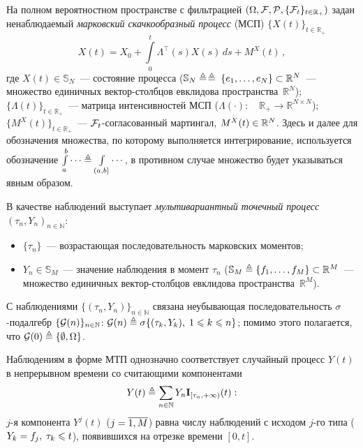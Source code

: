 \begin{multicols}{2}
 На полном вероятностном пространстве с фильтрацией
 $(\Omega,{\mathcal F},{\mathcal P},\{{\mathcal F}_t\}_{t \in \mathbb{R}_+})$ задан ненаблюдаемый
 \textit{марковский скачкообразный процесс} (МСП) $\{X(t)\}_{t \in \mathbb{R}_+}$~\cite{ElliottAM_94}
 \begin{equation}
 X(t) = X_0 + \int\limits_0^t \Lambda^{\top}(s)X(s)\,ds+M^X(t)\,,
 \label{eq:state}
 \end{equation}
 где
 $X(t) \in \mathbb{S}_N$~---
 со\-сто\-яние процесса ($\mathbb{S}_N \triangleq$\linebreak $\triangleq\;\{e_1, \ldots , e_N\} \subset
 \mathbb{R}^{N}$~--- множество единичных век\-тор-столб\-цов евклидова пространства~$\mathbb{R}^{N}$);
 $\{\Lambda(t)\}_{t \in \mathbb{R}_+}$~--- матрица
 интенсивностей МСП ($\Lambda(\cdot):\quad \mathbb{R}_+ \to
 \mathbb{R}^{N \times N}$);
$\{M^X(t)\}_{t \in \mathbb{R}_+}$~---
 ${\mathcal F}_t$-со\-гла\-со\-ван\-ный мартингал, $M^X(t)\hm \in \mathbb{R}^N$.
 Здесь и далее для обозначения множества, по которому
 выполняется интегрирование, используется обозначение
 $\int\limits_a^b \cdots \triangleq \int\limits_{(a,b]}\cdots$, в противном случае
 множество будет указываться явным образом.

 В качестве наблюдений выступает \textit{мультивариантный точечный
 процесс}~\cite{LS_86} $(\tau_n,Y_n)_{n \in \mathbb{N}}$:
 \begin{itemize}
  \item $\{\tau_n\} $~--- возрастающая последовательность
  марковских моментов;
  \item $Y_n \in \mathbb{S}_M$~--- значение наблюдения в
  момент $\tau_n$ ($\mathbb{S}_M \triangleq\{f_1, \ldots , f_M\}
  \subset\mathbb{R}^{M}$~--- множество единичных век\-тор-столб\-цов
  евклидова пространства~$\mathbb{R}^{M}$).
 \end{itemize}

 С наблюдениями $\{(\tau_n,Y_n)\}_{n \in \mathbb{N}}$ связана неубывающая
 последовательность $\sigma$-под\-алгебр $\{{\mathcal G}(n)\}_{n \in \mathbb{N}}$:
 $\G(n) \ebd \sigma\{(\tau_k,Y_k), \; 1 \hm\leqslant k \hm\leqslant n\}$;
 помимо этого полагается, что ${\mathcal G}(0) \triangleq \{\emptyset, \Omega\}$.

 Наблюдениям в форме МТП однозначно соответствует случайный процесс $Y(t)$ в
 непрерывном времени со считающими компонентами
 \begin{equation*}
 Y(t) \triangleq \sum\limits_{n \in \mathbb{N}}Y_n\mathbf{I}_{[\tau_{n},+\infty)}(t):
 \end{equation*}
 $j$-я компонента $Y^j(t)$ ($j\hm=\overline{1,M}$) равна числу наблюдений с
 исходом $j$-го типа ($Y_k\hm=f_j, \; \tau_k \hm\leqslant t$), появившихся
 на отрезке времени $[0,t]$.


\end{multicols}
